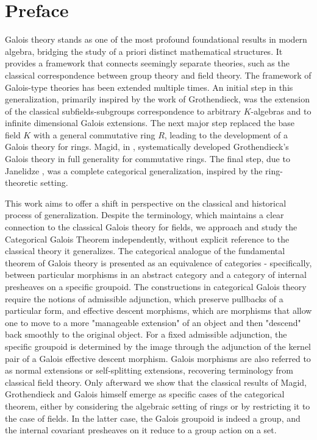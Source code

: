 {}
\chapter*{Preface}

Galois theory stands as one of the most profound foundational results in modern algebra, bridging the study of a priori distinct mathematical structures. It provides a framework that connects seemingly separate theories, such as the classical correspondence between group theory and field theory. The framework of Galois-type theories has been extended multiple times. An initial step in this generalization, primarily inspired by the work of Grothendieck, was the extension of the classical subfields-subgroups correspondence to arbitrary $K$-algebras and to infinite dimensional Galois extensions. The next major step replaced the base field $K$ with a general commutative ring $R$, leading to the development of a Galois theory for rings. Magid, in \cite{magid2014separable}, systematically developed Grothendieck's Galois theory in full generality for commutative rings. The final step, due to Janelidze \cite{JANELIDZE1990270}, was a complete categorical generalization, inspired by the ring-theoretic setting.

\medskip

This work aims to offer a shift in perspective on the classical and historical process of generalization. Despite the terminology, which maintains a clear connection to the classical Galois theory for fields, we approach and study the Categorical Galois Theorem independently, without explicit reference to the classical theory it generalizes. The categorical analogue of the fundamental theorem of Galois theory is presented as an equivalence of categories - specifically, between particular morphisms in an abstract category and a category of internal presheaves on a specific groupoid. The constructions in categorical Galois theory require the notions of admissible adjunction, which preserve pullbacks of a particular form, and effective descent morphisms, which are morphisms that allow one to move to a more "manageable extension" of an object and then "descend" back smoothly to the original object. For a fixed admissible adjunction, the specific groupoid is determined by the image through the adjunction of the kernel pair of a Galois effective descent morphism. Galois morphisms are also referred to as normal extensions or self-splitting extensions, recovering terminology from classical field theory. Only afterward we show that the classical results of Magid, Grothendieck and Galois himself emerge as specific cases of the categorical theorem, either by considering the algebraic setting of rings or by restricting it to the case of fields. In the latter case, the Galois groupoid is indeed a group, and the internal covariant presheaves on it reduce to a group action on a set.


